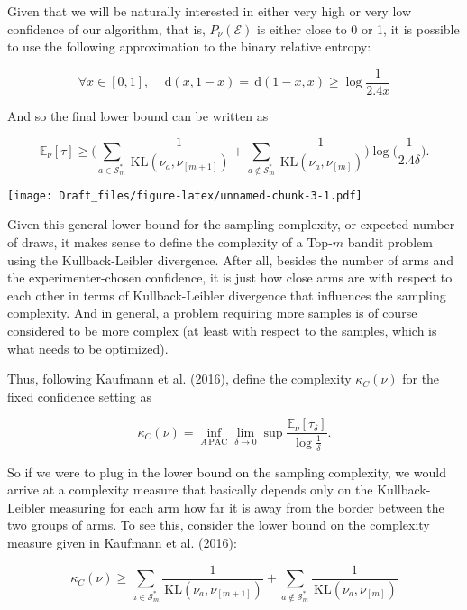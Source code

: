 \documentclass[12pt,]{article}
\newcommand{\KL}{\,\text{KL}}
\newcommand{\der}{\,\text{d}}
\begin{document}
Given that we will be naturally interested in either very high or very
low confidence of our algorithm, that is, \(P_\nu(\mathcal{E})\) is
either close to 0 or 1, it is possible to use the following
approximation to the binary relative entropy:

\begin{equation}\label{bre_approx}
\forall x \in [0,1], \quad \der(x,1-x) = \der(1-x,x) \geq \log \frac{1}{2.4x}
\end{equation}

And so the final lower bound can be written as

\begin{equation*}
\mathbb{E}_{\nu}[\tau] \geq \Big( \sum_{a \in \mathcal{S}_m^*} \frac{1}{\KL(\nu_a, \nu_{[m+1]})} + \sum_{a \notin \mathcal{S}_m^*} \frac{1}{\KL(\nu_a, \nu_{[m]})} \Big) \log \big(\frac{1}{2.4\delta} \big).
\end{equation*}

\texttt{[image: Draft\_files/figure-latex/unnamed-chunk-3-1.pdf]}

Given this general lower bound for the sampling complexity, or expected
number of draws, it makes sense to define the complexity of a Top-\(m\)
bandit problem using the Kullback-Leibler divergence. After all, besides
the number of arms and the experimenter-chosen confidence, it is just
how close arms are with respect to each other in terms of
Kullback-Leibler divergence that influences the sampling complexity. And
in general, a problem requiring more samples is of course considered to
be more complex (at least with respect to the samples, which is what
needs to be optimized).

Thus, following Kaufmann et al. (2016), define the complexity
\(\kappa_C(\nu)\) for the fixed confidence setting as

\begin{equation}
\kappa_C(\nu) = \inf_{A \, \text{PAC}} \lim_{\delta \to 0} \sup \frac{\mathbb{E}_{\nu}[\tau_{\delta}]}{\log \frac{1}{\delta}}.
\end{equation}

So if we were to plug in the lower bound on the sampling complexity, we
would arrive at a complexity measure that basically depends only on the
Kullback-Leibler measuring for each arm how far it is away from the
border between the two groups of arms. To see this, consider the lower
bound on the complexity measure given in Kaufmann et al. (2016):

\begin{equation*}
\kappa_C(\nu) \geq \sum_{a \in \mathcal{S}_m^*} \frac{1}{\KL(\nu_a, \nu_{[m+1]})} + \sum_{a \notin \mathcal{S}_m^*} \frac{1}{\KL(\nu_a, \nu_{[m]})}
\end{equation*}
\end{document}
